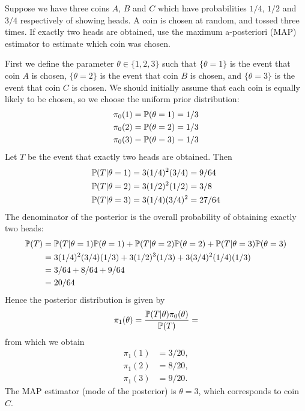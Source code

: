 \begin{exercise}
Suppose we have three coins $A$, $B$ and $C$ which have probabilities $1/4$, $1/2$ and $3/4$ respectively of showing heads. A coin is chosen at random, and tossed three times. If exactly two heads are obtained, use the maximum a-posteriori (MAP) estimator to estimate which coin was chosen.
\begin{answer}
First we define the parameter $\theta\in\{1,2,3\}$ such that $\{\theta=1\}$ is the event that coin $A$ is chosen, $\{\theta=2\}$ is the event that coin $B$ is chosen, and $\{\theta=3\}$ is the event that coin $C$ is chosen. We should initially assume that each coin is equally likely to be chosen, so we choose the uniform prior distribution:
\begin{align*}
\pi_0(1) & = \mathbb{P}(\theta=1) = 1/3 \\
\pi_0(2) & = \mathbb{P}(\theta=2) = 1/3 \\
\pi_0(3) & = \mathbb{P}(\theta=3) = 1/3 
\end{align*}
Let $T$ be the event that exactly two heads are obtained. Then
\begin{align*}
\mathbb{P}(T|\theta=1)	& = 3(1/4)^2(3/4) = 9/64 \\
\mathbb{P}(T|\theta=2)	& = 3(1/2)^2(1/2) = 3/8 \\
\mathbb{P}(T|\theta=3)	& = 3(1/4)(3/4)^2 = 27/64
\end{align*}
The denominator of the posterior is the overall probability of obtaining exactly two heads:
\begin{align*}
\mathbb{P}(T) 	
	& = \mathbb{P}(T|\theta=1)\mathbb{P}(\theta=1) + \mathbb{P}(T|\theta=2)\mathbb{P}(\theta=2) + \mathbb{P}(T|\theta=3)\mathbb{P}(\theta=3) \\
	& = 3(1/4)^2(3/4)(1/3) + 3(1/2)^3(1/3) + 3(3/4)^2(1/4)(1/3) \\
	& = 3/64 + 8/64 + 9/64 \\
	& = 20/64
\end{align*}
Hence the posterior distribution is given by
\[
\pi_1(\theta) = \frac{\mathbb{P}(T|\theta)\pi_0(\theta)}{\mathbb{P}(T)} = 
\]
from which we obtain
\begin{align*}
\pi_1(1) & = 3/20, \\
\pi_1(2) & = 8/20, \\
\pi_1(3) & = 9/20.
\end{align*}
The MAP estimator (mode of the posterior) is $\theta=3$, which corresponds to coin $C$.
\end{answer}
\end{exercise}

